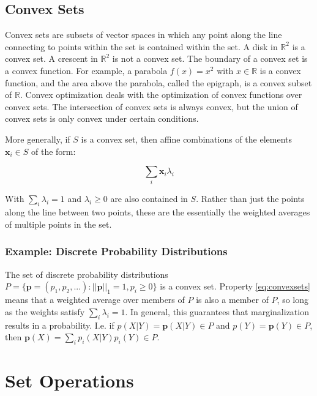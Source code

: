 \subsection{Convex Sets}
Convex sets are subsets of vector spaces in which any point along the line connecting to points within the set is contained within the set. A disk in $\mathbb{R}^2$ is a convex set. A crescent in $\mathbb{R}^2$ is not a convex set. The boundary of a convex set is a convex function. For example, a parabola $f(x) = x^2$ with $x\in\mathbb{R}$ is a convex function, and the area above the parabola, called the epigraph, is a convex subset of $\mathbb{R}$. Convex optimization deals with the optimization of convex functions over convex sets. The intersection of convex sets is always convex, but the union of convex sets is only convex under certain conditions. 

More generally, if $S$ is a convex set, then affine combinations of the elements $\mathbf{x}_i  \in S$ of the form:

\begin{equation}
\sum_i \mathbf{x}_i \lambda_i 
\label{eq:convexsets}
\end{equation}  

With $\sum_i \lambda_i = 1$ and $\lambda_i\geq 0$ are also contained in $S$. Rather than just the points along the line between two points, these are the essentially the weighted averages of multiple points in the set.  

\subsubsection{Example: Discrete Probability Distributions}
The set of discrete probability distributions $P = \{ \mathbf{p}=(p_1,p_2,...): ||\mathbf{p}||_1 = 1, p_i \geq 0\}$ is a convex set. Property \ref{eq:convexsets} means that a weighted average over members of $P$ is also a member of $P$, so long as the weights satisfy $\sum_i \lambda_i = 1$. In general, this guarantees that marginalization results in a probability. I.e. if $p(X|Y) = \mathbf{p}(X|Y) \in P$ and $p(Y) = \mathbf{p}(Y) \in P$, then $\mathbf{p}(X) = \sum_i p_i(X|Y) p_i(Y) \in P$. 





\section{Set Operations}

